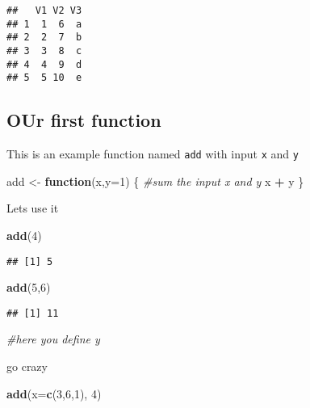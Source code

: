 \documentclass[]{article}
\newenvironment{Shaded}{\begin{snugshade}}{\end{snugshade}}
\newcommand{\CommentTok}[1]{\textcolor[rgb]{0.56,0.35,0.01}{\textit{#1}}}
\newcommand{\ControlFlowTok}[1]{\textcolor[rgb]{0.13,0.29,0.53}{\textbf{#1}}}
\newcommand{\DataTypeTok}[1]{\textcolor[rgb]{0.13,0.29,0.53}{#1}}
\newcommand{\DecValTok}[1]{\textcolor[rgb]{0.00,0.00,0.81}{#1}}
\newcommand{\KeywordTok}[1]{\textcolor[rgb]{0.13,0.29,0.53}{\textbf{#1}}}
\newcommand{\NormalTok}[1]{#1}
\newcommand{\OperatorTok}[1]{\textcolor[rgb]{0.81,0.36,0.00}{\textbf{#1}}}
\newcommand{\StringTok}[1]{\textcolor[rgb]{0.31,0.60,0.02}{#1}}
\begin{document}
\begin{verbatim}
##   V1 V2 V3
## 1  1  6  a
## 2  2  7  b
## 3  3  8  c
## 4  4  9  d
## 5  5 10  e
\end{verbatim}

\hypertarget{our-first-function}{%
\subsection{OUr first function}\label{our-first-function}}

This is an example function named \texttt{add} with input \texttt{x} and
\texttt{y}

\begin{Shaded}
\begin{Highlighting}[]
\NormalTok{add <-}\StringTok{ }\ControlFlowTok{function}\NormalTok{(x,}\DataTypeTok{y=}\DecValTok{1}\NormalTok{) \{}
  \CommentTok{#sum the input x and y}
\NormalTok{  x }\OperatorTok{+}\StringTok{ }\NormalTok{y}
\NormalTok{\}}
\end{Highlighting}
\end{Shaded}

Lets use it

\begin{Shaded}
\begin{Highlighting}[]
\KeywordTok{add}\NormalTok{(}\DecValTok{4}\NormalTok{)}
\end{Highlighting}
\end{Shaded}

\begin{verbatim}
## [1] 5
\end{verbatim}

\begin{Shaded}
\begin{Highlighting}[]
\KeywordTok{add}\NormalTok{(}\DecValTok{5}\NormalTok{,}\DecValTok{6}\NormalTok{)}
\end{Highlighting}
\end{Shaded}

\begin{verbatim}
## [1] 11
\end{verbatim}

\begin{Shaded}
\begin{Highlighting}[]
\CommentTok{#here you define y}
\end{Highlighting}
\end{Shaded}

go crazy

\begin{Shaded}
\begin{Highlighting}[]
\KeywordTok{add}\NormalTok{(}\DataTypeTok{x=}\KeywordTok{c}\NormalTok{(}\DecValTok{3}\NormalTok{,}\DecValTok{6}\NormalTok{,}\DecValTok{1}\NormalTok{), }\DecValTok{4}\NormalTok{)}
\end{Highlighting}
\end{Shaded}
\end{document}
